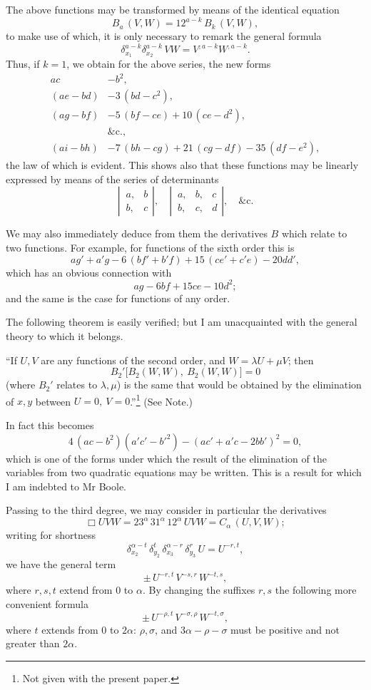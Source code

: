 \documentclass[11pt]{article}
\begin{document}
The above functions may be transformed by means of the identical equation
\[
B_a\,(V, W) = 12^{a-k}\,B_k\,(V, W),
\]
to make use of which, it is only necessary to remark the general formula
\[
\delta_{x_1}^{a-k}\delta_{x_2}^{a-k}\,V W = V^{,a-k}W^{,a-k}.
\]
Thus, if $k=1$, we obtain for the above series, the new forms
\[
\begin{aligned}
ac &- b^2,\\
(ae - bd) &- 3\,(bd - c^2),\\
(ag - bf) &- 5\,(bf - ce) + 10\,(ce - d^2),\\
&\&\text{c.},\\
(ai - bh) &- 7\,(bh - cg) + 21\,(cg - df) - 35\,(df - e^2),
\end{aligned}
\]
the law of which is evident. This shows also that these functions may be linearly
expressed by means of the series of determinants
\[
\left|\,\begin{array}{cc} a, & b \\ b, & c \end{array}\right|,\quad
\left|\,\begin{array}{ccc} a, & b, & c \\ b, & c, & d \end{array}\right|,\quad \&\text{c.}
\]

We may also immediately deduce from them the derivatives $B$ which relate to two
functions. For example, for functions of the sixth order this is
\[
a g' + a' g - 6\,(b f' + b' f) + 15\,(c e' + c' e) - 20 d d',
\]
which has an obvious connection with
\[
a g - 6 b f + 15 c e - 10 d^2;
\]
and the same is the case for functions of any order.

The following theorem is easily verified; but I am unacquainted with the general
theory to which it belongs.

``If $U, V$ are any functions of the second order, and $W = \lambda U + \mu V$; then
\[
B_2'\bigl[B_2(W, W),\ B_2(W, W)\bigr] = 0
\]
(where $B_2'$ relates to $\lambda, \mu$) is the same that would be obtained by the elimination of
$x, y$ between $U=0,\ V=0$.''\footnote{Not given with the present paper.} (See Note.)

In fact this becomes
\[
4\,(ac - b^2)(a'c' - b'^2) - (ac' + a'c - 2bb')^2 = 0,
\]
which is one of the forms under which the result of the elimination of the variables
from two quadratic equations may be written. This is a result for which I am
indebted to Mr Boole.

\medskip

Passing to the third degree, we may consider in particular the derivatives
\[
\Box U V W = 23^\alpha\,31^\alpha\,12^\alpha\,U V W = C_\alpha\,(U, V, W);
\]
writing for shortness
\[
\delta_{x_2}^{\alpha-t}\,\delta_{y_2}^{t}\,\delta_{x_3}^{\alpha-r}\,\delta_{y_3}^{r}\,U = U^{-r, t},
\]
we have the general term
\[
\pm\,U^{-r, t}\,V^{-s, r}\,W^{-t, s},
\]
where $r, s, t$ extend from 0 to $\alpha$. By changing the suffixes $r, s$ the following more
convenient formula
\[
\pm\,U^{-\rho, t}\,V^{-\sigma, \rho}\,W^{-t, \sigma},
\]
where $t$ extends from 0 to $2\alpha$: $\rho, \sigma$, and $3\alpha - \rho - \sigma$ must be positive and not greater
than $2\alpha$.
\end{document}
